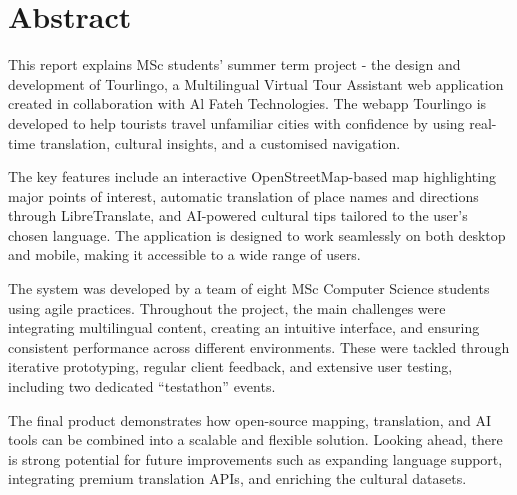 \chapter*{Abstract}

This report explains MSc students' summer term project - the design and development of Tourlingo, a Multilingual Virtual Tour Assistant web application created in collaboration with Al Fateh Technologies. The webapp Tourlingo is developed to help tourists travel unfamiliar cities with confidence by using real-time translation, cultural insights, and a customised navigation.

The key features include an interactive OpenStreetMap-based map highlighting major points of interest, automatic translation of place names and directions through LibreTranslate, and AI-powered cultural tips tailored to the user’s chosen language. The application is designed to work seamlessly on both desktop and mobile, making it accessible to a wide range of users.

The system was developed by a team of eight MSc Computer Science students using agile practices. Throughout the project, the main challenges were integrating multilingual content, creating an intuitive interface, and ensuring consistent performance across different environments. These were tackled through iterative prototyping, regular client feedback, and extensive user testing, including two dedicated “testathon” events.

The final product demonstrates how open-source mapping, translation, and AI tools can be combined into a scalable and flexible solution. Looking ahead, there is strong potential for future improvements such as expanding language support, integrating premium translation APIs, and enriching the cultural datasets.
